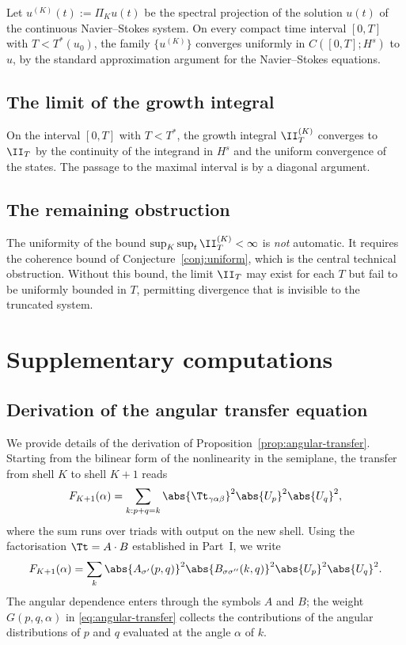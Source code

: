 Let $u^{(K)}(t) := \Pi_K u(t)$ be the spectral projection of the 
solution $u(t)$ of the continuous Navier--Stokes system. On every 
compact time interval $[0,T]$ with $T<T^\ast(u_0)$, the family 
$\{u^{(K)}\}$ converges uniformly in $C([0,T];H^s)$ to $u$, by the 
standard approximation argument for the Navier--Stokes equations.

\subsection{The limit of the growth integral}
\label{app:limit-integral}

On the interval $[0,T]$ with $T<T^\ast$, the growth integral 
$\II_T^{(K)}$ converges to $\II_T$ by the continuity of the 
integrand in $H^s$ and the uniform convergence of the states. The 
passage to the maximal interval is by a diagonal argument.

\subsection{The remaining obstruction}
\label{app:obstruction}

The uniformity of the bound $\sup_K\sup_t\II_T^{(K)} < \infty$ is 
\emph{not} automatic. It requires the coherence bound of 
Conjecture~\ref{conj:uniform}, which is the central technical 
obstruction. Without this bound, the limit $\II_T$ may exist for 
each $T$ but fail to be uniformly bounded in $T$, permitting 
divergence that is invisible to the truncated system.

\section{Supplementary computations}
\label{app:supp-IV}

\subsection{Derivation of the angular transfer equation}
\label{app:angular-transfer}

We provide details of the derivation of Proposition~\ref{prop:angular-transfer}. 
Starting from the bilinear form of the nonlinearity in the semiplane, 
the transfer from shell $K$ to shell $K+1$ reads
\begin{equation*}
F_{K+1}(\alpha) = \sum_{k:p+q=k}\abs{\Tt_{\gamma\alpha\beta}}^2
\abs{U_p}^2\abs{U_q}^2,
\end{equation*}
where the sum runs over triads with output on the new shell. Using 
the factorisation $\Tt = A\cdot B$ established in Part~I, we write
\begin{equation*}
F_{K+1}(\alpha) = \sum_{k}\abs{A_{\sigma'}(p,q)}^2
\abs{B_{\sigma\sigma''}(k,q)}^2\abs{U_p}^2\abs{U_q}^2.
\end{equation*}
The angular dependence enters through the symbols $A$ and $B$; the 
weight $G(p,q,\alpha)$ in \eqref{eq:angular-transfer} collects the 
contributions of the angular distributions of $p$ and $q$ evaluated 
at the angle $\alpha$ of $k$.

